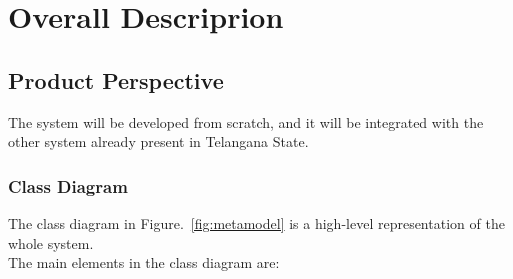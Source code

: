 \section{Overall Descriprion}

\subsection{Product Perspective}
The system will be developed from scratch, and it will be integrated with the other system already present in Telangana State.

\subsubsection{Class Diagram}
The class diagram in Figure.~\ref{fig:metamodel} is a high-level representation of the whole system.\\
The main elements in the class diagram are:
